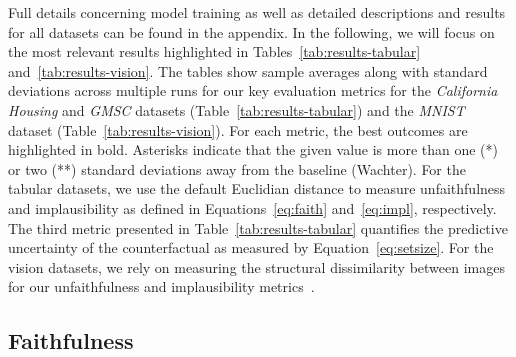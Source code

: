 \documentclass[letterpaper]{article} %
\begin{document}
Full details concerning model training as well as detailed descriptions and results for all datasets can be found in the appendix. In the following, we will focus on the most relevant results highlighted in Tables~\ref{tab:results-tabular} and~\ref{tab:results-vision}. The tables show sample averages along with standard deviations across multiple runs for our key evaluation metrics for the \textit{California Housing} and \textit{GMSC} datasets (Table~\ref{tab:results-tabular}) and the \textit{MNIST} dataset (Table~\ref{tab:results-vision}). For each metric, the best outcomes are highlighted in bold. Asterisks indicate that the given value is more than one (*) or two (**) standard deviations away from the baseline (Wachter). For the tabular datasets, we use the default Euclidian distance to measure unfaithfulness and implausibility as defined in Equations~\ref{eq:faith} and~\ref{eq:impl}, respectively. The third metric presented in Table~\ref{tab:results-tabular} quantifies the predictive uncertainty of the counterfactual as measured by Equation~\ref{eq:setsize}. For the vision datasets, we rely on measuring the structural dissimilarity between images for our unfaithfulness and implausibility metrics~\citep{wang2003multiscale}. 

\subsection{Faithfulness}
\end{document}
